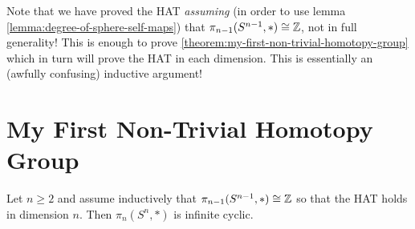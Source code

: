 \begin{remark}
Note that we have proved the HAT \textit{assuming} (in order to use lemma \ref{lemma:degree-of-sphere-self-maps}) that $\pi_{n-1}(S^{n-1},*)\cong{\mathbb Z}$, not in full generality! This is enough to prove \ref{theorem:my-first-non-trivial-homotopy-group} which in turn will prove the HAT in each dimension. This is essentially an (awfully confusing) inductive argument!
\end{remark}

\section{My First Non-Trivial Homotopy Group}

\begin{theorem}\label{theorem:my-first-non-trivial-homotopy-group}
Let $n\geq2$ and assume inductively that $\pi_{n-1}(S^{n-1},*)\cong{\mathbb Z}$ so that the HAT holds in dimension $n$. Then $\pi_n(S^n,*)$ is infinite cyclic.
\end{theorem}

